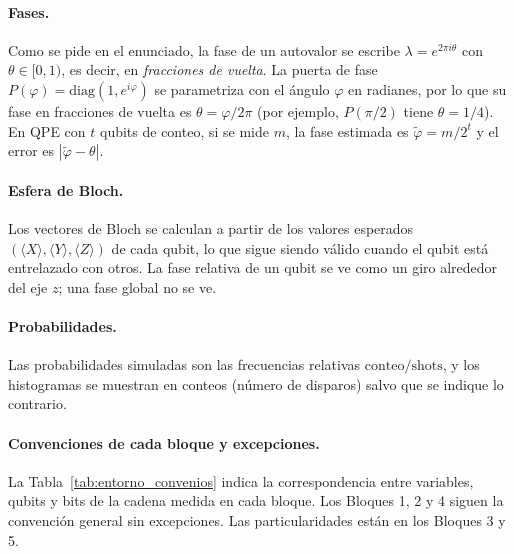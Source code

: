 \paragraph{Fases.} Como se pide en el enunciado, la fase de un autovalor se escribe $\lambda=e^{2\pi i\theta}$ con $\theta\in[0,1)$, es decir, en \emph{fracciones de vuelta}.
La puerta de fase $P(\varphi)=\mathrm{diag}(1,e^{i\varphi})$ se parametriza con el ángulo $\varphi$ en radianes, por lo que su fase en fracciones de vuelta es $\theta=\varphi/2\pi$
(por ejemplo, $P(\pi/2)$ tiene $\theta=1/4$). En QPE con $t$ qubits de conteo, si se mide $m$, la fase estimada es $\tilde\varphi=m/2^t$ y el error es $|\tilde\varphi-\theta|$.

\paragraph{Esfera de Bloch.} Los vectores de Bloch se calculan a partir de los valores esperados $(\langle X\rangle,\langle Y\rangle,\langle Z\rangle)$ de cada qubit, lo que
sigue siendo válido cuando el qubit está entrelazado con otros. La fase relativa de un qubit se ve como un giro alrededor del eje $z$; una fase global no se ve.

\paragraph{Probabilidades.} Las probabilidades simuladas son las frecuencias relativas $\text{conteo}/\text{shots}$, y los histogramas se muestran en conteos
(número de disparos) salvo que se indique lo contrario.

\paragraph{Convenciones de cada bloque y excepciones.} La Tabla~\ref{tab:entorno_convenios} indica la correspondencia entre variables, qubits y bits de la cadena medida
en cada bloque. Los Bloques 1, 2 y 4 siguen la convención general sin excepciones. Las particularidades están en los Bloques 3 y 5.


